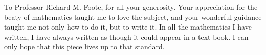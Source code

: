 To Professor Richard M. Foote, for all your generosity.
Your appreciation for the beaty of mathematics taught me to love the subject, and your wonderful guidance taught me not only how to do it, but to write it.
In all the mathematics I have written, I have always written as though it could appear in a text book.
I can only hope that this piece lives up to that standard.
